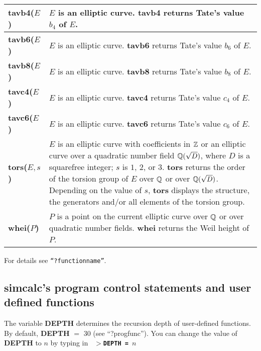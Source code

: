 {\begin{tabular}{|p{1.95in}|p{3.83in}|}
{\bf tavb4($E$)} &
$E$ is an elliptic curve.\newline
{\bf tavb4} returns Tate's value $b_4$ of $E$.\\ \hline

{\bf tavb6($E$)} &
$E$ is an elliptic curve.\newline
{\bf tavb6} returns Tate's value $b_6$ of $E$.\\ \hline

{\bf tavb8($E$)} &
$E$ is an elliptic curve.\newline
{\bf tavb8} returns Tate's value $b_8$ of $E$.\\ \hline

{\bf tavc4($E$)} &
$E$ is an elliptic curve.\newline
{\bf tavc4} returns Tate's value $c_4$ of $E$.\\ \hline

{\bf tavc6($E$)} &
$E$ is an elliptic curve.\newline
{\bf tavc6} returns Tate's value $c_6$ of $E$.\\ \hline

{\bf tors($E,s$)} &
$E$ is an elliptic curve with coefficients in $\mbox{$\mathbb Z$}$ or an elliptic curve
over a quadratic number field $\mbox{$\mathbb Q$}(\sqrt{D})$, where $D$ is a squarefree
integer;\newline
$s$ is $1$, $2$, or $3$.\newline
{\bf tors} returns the order of the torsion group of $E$ over $\mbox{$\mathbb Q$}$ or
over $\mbox{$\mathbb Q$}(\sqrt{D})$.
Depending on the value of $s$, {\bf tors} displays the structure,
the generators and/or all elements of the torsion group.\\ \hline

{\bf whei($P$)} &
$P$ is a point on the current elliptic curve over $\mbox{$\mathbb Q$}$ or over 
quadratic number fields.\newline
{\bf whei} returns the Weil height of $P$.\\ \hline
\end{tabular}}

\leer\leer
For details see  {\tt ``?functionname''}.

\newpage

\subsection{{\bf simcalc}'s program control statements and user defined
            functions}
The variable {\bf DEPTH} determines the recursion depth of user-defined
functions. By default, {\bf DEPTH} $=$ 30 (see ``?progfunc''). You can 
change the value of {\bf DEPTH} to $n$ by typing in 
\leer
{\tt
  {\bf $>$DEPTH = $n$} \care 
}
\leer


